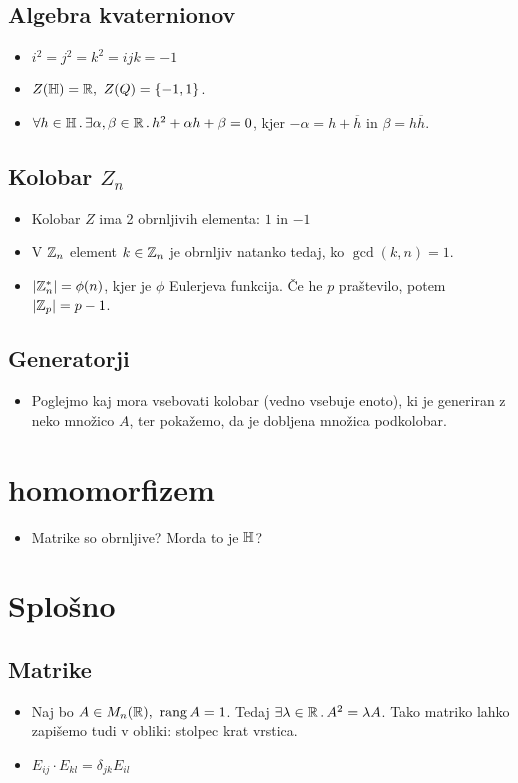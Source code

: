 \subsection{Algebra kvaternionov}
\begin{itemize}
    \item \(i^2=j^2=k^2=ijk=-1\)
    \item \(Z(\mathbb{H}) = \mathbb{R}, \ Z(Q) = \{-1, 1\}\).
    \item \(\forall h \in \mathbb{H} \,.\, \exists \alpha, \beta \in \mathbb{R} \,.\, h^2 + \alpha h + \beta = 0\), kjer \(-\alpha = h + \overline{h}\) in \(\beta = h \overline{h}\).
\end{itemize}

\subsection{Kolobar \(Z_n\)}
\begin{itemize}
    \item Kolobar \(Z\) ima 2 obrnljivih elementa: \(1\) in \(-1\)
    \item V \(\mathbb{Z}_n\) element \(k \in \mathbb{Z}_n\) je obrnljiv natanko tedaj, ko \(\gcd (k, n) = 1\).
    \item \(|\mathbb{Z}_n^*| = \phi(n)\), kjer je \(\phi\) Eulerjeva funkcija. Če he \(p\) praštevilo, potem \(|\mathbb{Z}_p| = p - 1\).
\end{itemize}

\subsection{Generatorji}
\begin{itemize}
    \item Poglejmo kaj mora vsebovati kolobar (vedno vsebuje enoto), ki je generiran z neko množico \(A\), ter pokažemo, da je dobljena množica podkolobar.
\end{itemize}


\section{homomorfizem}
\begin{itemize}
    \item Matrike so obrnljive? Morda to je \(\mathbb{H}\)?
\end{itemize}

\section{Splošno}
\subsection{Matrike}
\begin{itemize}
    \item Naj bo \(A \in M_n(\mathbb{R}), \ \operatorname{rang} A = 1\). Tedaj \(\exists \lambda \in \mathbb{R} \,.\, A^2 = \lambda A\). Tako matriko lahko zapišemo tudi v obliki: stolpec krat vrstica.
    \item \(E_{ij} \cdot E_{kl} = \delta_{jk}E_{il}\)
\end{itemize}
